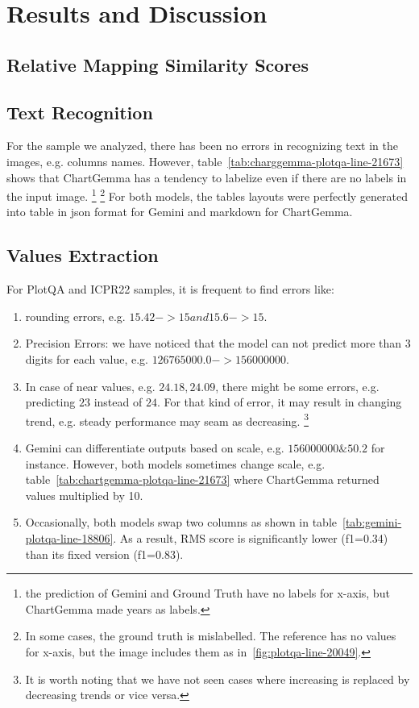 \documentclass[
	letterpaper, %
]{jdf}
\begin{document}
\section{Results and Discussion}\label{sect:qualitative-analysis}
\subsection{Relative Mapping Similarity Scores}\label{ssect:rms}
\subsection{Text Recognition}\label{ssect:qualitative-text-recognition}
For the sample we analyzed, there has been no errors in recognizing text in the images, e.g. columns names.
However, table~\ref{tab:charggemma-plotqa-line-21673} shows that ChartGemma has a tendency to labelize even if there are no labels in the input image.
\footnote{the prediction of Gemini and Ground Truth have no labels for x-axis, but ChartGemma made years as labels.}
\footnote{In some cases, the ground truth is mislabelled. The reference has no values for x-axis, but the image includes them as in~\ref{fig:plotqa-line-20049}.}
For both models, the tables layouts were perfectly generated into table in json format for Gemini and markdown for ChartGemma.

\subsection{Values Extraction}\label{ssect:values-extraction}
For PlotQA and ICPR22 samples, it is frequent to find errors like:
\begin{enumerate}
         \item rounding errors, e.g. $15.42->15 and 15.6->15$.
         \item Precision Errors: we have noticed that the model can not predict more than 3 digits for each value, e.g. $126765000.0->156000000$.
         \item In case of near values, e.g. $24.18, 24.09$, there might be some errors, e.g. predicting $23$ instead of $24$.
             For that kind of error, it may result in changing trend, e.g. steady performance may seam as decreasing.
             \footnote{It is worth noting that we have not seen cases where increasing is replaced by decreasing trends or vice versa.}
             \item Gemini can differentiate outputs based on scale, e.g. $156000000 \& 50.2$ for instance.
                 However, both models sometimes change scale, e.g. table~\ref{tab:chartgemma-plotqa-line-21673} where ChartGemma returned values multiplied by 10.
             \item Occasionally, both models swap two columns as shown in table~\ref{tab:gemini-plotqa-line-18806}.
                 As a result, RMS score is significantly lower (f1=0.34) than its fixed version (f1=0.83).
              \end{enumerate}
\end{document}
